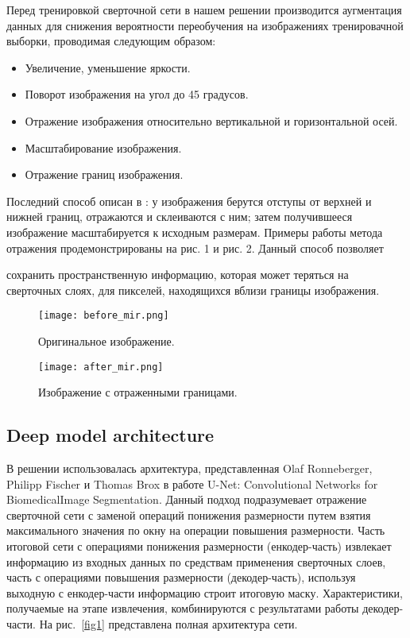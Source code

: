 \documentclass[runningheads]{llncs}
\begin{document}
Перед тренировкой сверточной сети в нашем решении производится аугментация данных для снижения вероятности переобучения на изображениях тренировачной выборки, проводимая следующим образом:
\begin{itemize}
\item Увеличение, уменьшение яркости.
\item Поворот изображения на угол до 45 градусов.
\item Отражение изображения относительно вертикальной и горизонтальной осей.
\item Масштабирование изображения.
\item Отражение границ изображения.
\end{itemize}
Последний способ описан в \cite{unet}: у изображения берутся отступы  от верхней и нижней границ, отражаются и склеиваются с ним; затем получившееся изображение масштабируется к исходным размерам. Примеры работы метода отражения продемонстрированы на рис. 1 и рис. 2. Данный способ позволяет {сохранить пространственную 
информацию, которая может теряться на сверточных
слоях, для пикселей, находящихся вблизи границы изображения.

\begin{figure}[H]
  \centering
  \begin{minipage}[b]{0.4\textwidth}
    \texttt{[image: before\_mir.png]}
    \caption{Оригинальное изображение.}
  \end{minipage}
  \hfill
  \begin{minipage}[b]{0.4\textwidth}
    \texttt{[image: after\_mir.png]}
    \caption{Изображение с отраженными границами.}
  \end{minipage}
\end{figure}

\subsection{Deep model architecture}

В решении использовалась архитектура, представленная
Olaf Ronneberger, Philipp Fischer и Thomas Brox в работе U-Net:
Convolutional Networks for BiomedicalImage Segmentation\cite{unet}. Данный
подход подразумевает отражение сверточной сети с заменой операций 
понижения размерности путем взятия максимального значения
по окну на операции повышения размерности. Часть итоговой сети с
операциями понижения размерности (енкодер-часть) извлекает информацию 
из входных данных по средствам применения сверточных
слоев, часть с операциями повышения размерности (декодер-часть),
используя выходную с енкодер-части информацию строит итоговую
маску. Характеристики, получаемые на этапе извлечения, комбинируются 
с результатами работы декодер-части. На рис.~\ref{fig1} представлена
полная архитектура сети.

}
\end{document}
